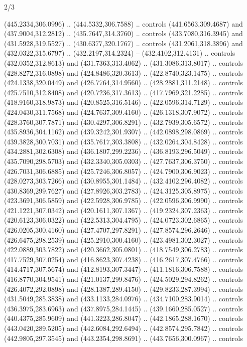 \begin{flagdescription}{2/3}
\begin{scope}[xshift=0.5\flaglength,yshift=0.5\flagwidth,scale=\flagwidth/495.65]
\begin{scope}[y=0.8pt, x=0.8pt, yscale=-1,shift={(-463.76,-309.78)}]
  (445.2334,306.0996) .. (444.5332,306.7588) .. controls (441.6563,309.4687) and
  (437.9004,312.2812) .. (435.7647,314.3760) .. controls (433.7080,316.3945) and
  (431.5928,319.5527) .. (430.6377,320.1767) .. controls (431.2061,318.3896) and
  (432.0322,315.6797) .. (432.2197,314.2324) -- (432.4102,312.4131) .. controls
  (432.0352,312.8613) and (431.7363,313.4062) .. (431.3086,313.8017) .. controls
  (428.8272,316.0898) and (424.8486,320.3613) .. (422.8740,323.1475) .. controls
  (424.1338,320.0449) and (426.7764,314.9560) .. (428.2881,311.2148) .. controls
  (425.7510,312.8408) and (420.7236,317.3613) .. (417.7969,321.2285) .. controls
  (418.9160,318.9873) and (420.8525,316.5146) .. (422.0596,314.7129) .. controls
  (424.0430,311.7568) and (424.7637,309.4160) .. (426.1318,307.9072) .. controls
  (428.3760,307.7871) and (430.4297,306.8291) .. (432.7939,305.6572) .. controls
  (435.8936,304.1162) and (439.3242,301.9307) .. (442.0898,298.0869) .. controls
  (439.3828,300.7031) and (435.7617,303.3808) .. (432.0264,304.8428) .. controls
  (434.2881,302.6308) and (436.1807,299.2236) .. (436.8193,296.5049) .. controls
  (435.7090,298.5703) and (432.3340,305.0303) .. (427.7637,306.3750) .. controls
  (426.7031,306.6885) and (425.7246,306.8057) .. (424.7900,306.9023) .. controls
  (428.0273,303.7266) and (430.8955,301.1484) .. (432.4102,296.4082) .. controls
  (430.8369,299.7627) and (427.8926,303.2783) .. (424.3125,305.8975) .. controls
  (423.3691,306.5859) and (422.5928,306.9785) .. (422.0596,306.9990) .. controls
  (421.1221,307.0342) and (420.1611,307.1367) .. (419.2324,307.2363) .. controls
  (420.6123,306.0322) and (422.5313,304.4795) .. (424.0723,302.6865) .. controls
  (426.0205,300.4160) and (427.4707,297.8291) .. (427.8574,296.2646) .. controls
  (426.6475,298.2539) and (425.2910,300.4160) .. (423.4981,302.3027) .. controls
  (422.0889,303.7822) and (420.3662,305.0801) .. (418.7549,306.2783) .. controls
  (417.7529,307.0254) and (416.8623,307.4238) .. (416.2617,307.4766) .. controls
  (414.4717,307.5674) and (412.8193,307.3447) .. (411.1816,306.7588) .. controls
  (416.8770,304.9541) and (421.0137,299.8476) .. (424.5029,294.8262) .. controls
  (426.4072,292.0898) and (428.1387,289.4150) .. (429.8233,287.3994) .. controls
  (431.5049,285.3838) and (433.1133,284.0976) .. (434.7100,283.9014) .. controls
  (436.3975,283.6963) and (437.8975,284.1445) .. (439.1660,285.0527) .. controls
  (440.4375,285.9609) and (441.3223,286.8047) .. (442.1865,288.1670) .. controls
  (443.0420,289.5205) and (442.6084,292.6494) .. (442.8574,295.7842) .. controls
  (442.9805,297.3545) and (443.2354,298.8691) .. (443.7656,300.0967) .. controls

\end{scope}
\end{scope}
\end{flagdescription}
